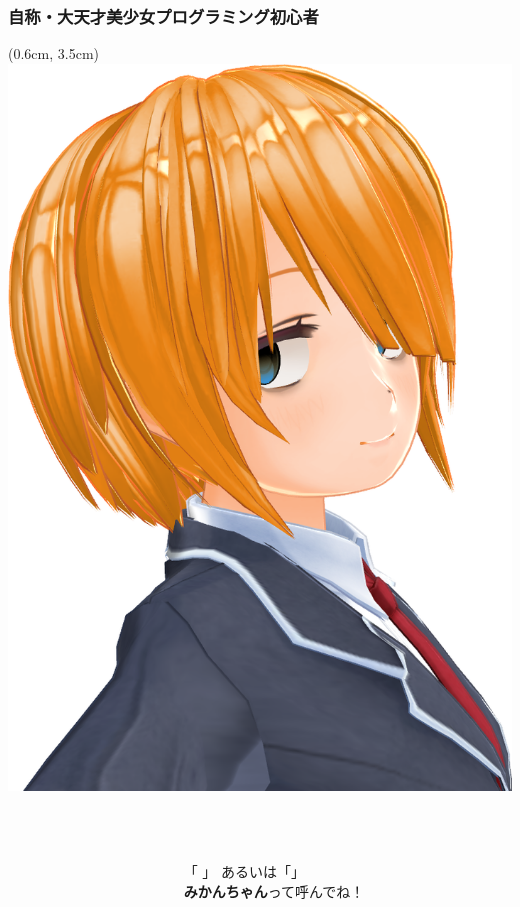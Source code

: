 \documentclass[
  lualatex,
  aspectratio=169,
  14pt
]{beamer}
\begin{document}
\begin{frame}
  \frametitle{自称・大天才美少女プログラミング初心者}

  \begin{textblock*}{0.5\paperwidth}(0.6cm, 3.5cm)
    \includegraphics[width=0.3\paperwidth]{./images/mikanchan.png}
  \end{textblock*}
  \begin{columns}
    \begin{column}{0.30\textwidth}
      \\~\\[-.25\baselineskip]
    \end{column}
    \begin{column}{0.69\textwidth}
      \\~\\[-.25\baselineskip]
      「 」
      あるいは「」\\
      \hspace{1.5\zw}\textbf{みかんちゃん}って呼んでね！
      \\~\\[-.5\baselineskip]


\end{column}
\end{columns}
\end{frame}
\end{document}
